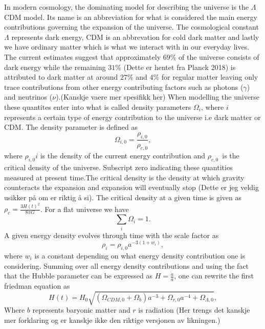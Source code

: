 In modern cosmology, the dominating model for describing the universe is the $\Lambda$CDM model. Its name is an abbreviation for what 
is considered the main energy contributions governing the expansion of the universe. The cosmological constant $\Lambda$ represents dark energy, CDM is an abbrevation for cold dark matter
and lastly we have ordinary matter which is what we interact with in our everyday lives. The current estimates suggest that approximately $69\%$ of the universe consists of dark energy while the remaining $31\%$ (Dette er hentet fra Planck 2018) is attributed to dark matter at around 
$27\%$ and $4\%$ for regular matter leaving only trace contributions from other energy contributing factors such as photons ($\gamma$) and neutrinos ($\nu$).(Kanskje vaere mer spesifikk her) When modelling the universe these quantites enter into 
what is called density parameters $\Omega_i$, where $i$ represents a certain type of energy contribution to the universe i.e dark matter or CDM. The density parameter is defined as
\begin{equation}
    \Omega_{i,0} = \frac{\rho_{i,0}}{\rho_{c,0}},
\end{equation}
where $\rho_{i,0}i$ is the density of the current energy contribution and $\rho_{c,0}$ is
the critical density of the universe. Subscript zero indicating these quantities
measured at present time.The critical density is the density at
which gravity counteracts the expansion and expansion will eventually stop
(Dette er jeg veldig usikker på om er riktig å si). The critical density at a
given time is given as $\rho_c=\frac{3H(t)^2}{8\pi G}$. For a flat universe we have
\begin{equation}
    \sum_i \Omega_i = 1.
\end{equation}
A given energy density evolves through time with the scale
factor as
\begin{equation}
    \rho_i=\rho_{i,0}a^{-3(1+w_i)},
\end{equation}
where $w_i$ is a constant depending on what energy density contribution one is
considering. Summing over all energy
density contributions and using the fact that the Hubble parameter can be
expressed as $H=\frac{\dot{a}}{a}$, one can rewrite the first friedman equation
as
\begin{equation}
    H(t)=H_0\sqrt{(\Omega_{CDM,0} + \Omega_{b})a^{-3} + \Omega_{r,0}a^{-4} + \Omega_{\Lambda,0}},
\end{equation}
Where $b$ represents baryonic matter and $r$ is radiation
(Her trengs det kanskje mer forklaring og er kanskje ikke den riktige versjonen
av likningen.) 

